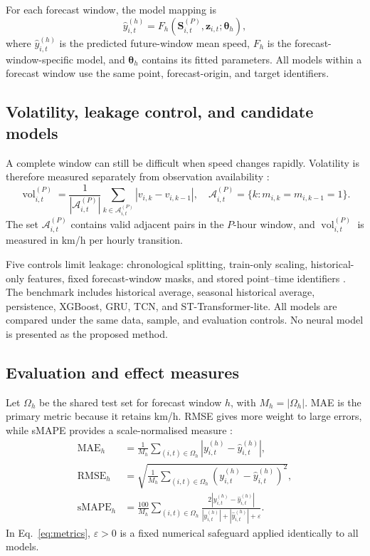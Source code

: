 \documentclass[smallcondensed]{svjour3}
\newcommand{\vect}[1]{\boldsymbol{#1}}
\begin{document}
For each forecast window, the model mapping is \cite{ref1,ref2,ref4}
\begin{equation}
\widehat{y}_{i,t}^{(h)}
=
F_h\!\left(\vect{S}_{i,t}^{(P)},\vect{z}_{i,t};\vect{\theta}_h\right),
\label{eq:model}
\end{equation}
where $\widehat{y}_{i,t}^{(h)}$ is the predicted future-window mean speed, $F_h$ is the forecast-window-specific model, and $\vect{\theta}_h$ contains its fitted parameters. All models within a forecast window use the same point, forecast-origin, and target identifiers.

\subsection{Volatility, leakage control, and candidate models}
A complete window can still be difficult when speed changes rapidly. Volatility is therefore measured separately from observation availability \cite{ref7,ref15}:
\begin{equation}
\operatorname{vol}_{i,t}^{(P)}
=
\frac{1}{|\mathcal{A}_{i,t}^{(P)}|}
\sum_{k\in\mathcal{A}_{i,t}^{(P)}}|v_{i,k}-v_{i,k-1}|,
\quad
\mathcal{A}_{i,t}^{(P)}
=
\{k:m_{i,k}=m_{i,k-1}=1\}.
\label{eq:volatility}
\end{equation}
The set $\mathcal{A}_{i,t}^{(P)}$ contains valid adjacent pairs in the $P$-hour window, and $\operatorname{vol}_{i,t}^{(P)}$ is measured in km/h per hourly transition.

Five controls limit leakage: chronological splitting, train-only scaling, historical-only features, fixed forecast-window masks, and stored point--time identifiers \cite{ref3,ref9}. The benchmark includes historical average, seasonal historical average, persistence, XGBoost, GRU, TCN, and ST-Transformer-lite. All models are compared under the same data, sample, and evaluation controls. No neural model is presented as the proposed method.

\subsection{Evaluation and effect measures}
Let $\Omega_h$ be the shared test set for forecast window $h$, with $M_h=|\Omega_h|$. MAE is the primary metric because it retains km/h. RMSE gives more weight to large errors, while sMAPE provides a scale-normalised measure \cite{ref18,ref19}:
\begin{equation}
\begin{aligned}
\operatorname{MAE}_h
&=\frac{1}{M_h}\sum_{(i,t)\in\Omega_h}|y_{i,t}^{(h)}-\widehat{y}_{i,t}^{(h)}|,\\
\operatorname{RMSE}_h
&=\sqrt{\frac{1}{M_h}\sum_{(i,t)\in\Omega_h}(y_{i,t}^{(h)}-\widehat{y}_{i,t}^{(h)})^2},\\
\operatorname{sMAPE}_h
&=\frac{100}{M_h}\sum_{(i,t)\in\Omega_h}
\frac{2|y_{i,t}^{(h)}-\widehat{y}_{i,t}^{(h)}|}
{|y_{i,t}^{(h)}|+|\widehat{y}_{i,t}^{(h)}|+\varepsilon}.
\end{aligned}
\label{eq:metrics}
\end{equation}
In Eq.~\eqref{eq:metrics}, $\varepsilon>0$ is a fixed numerical safeguard applied identically to all models.
\end{document}
